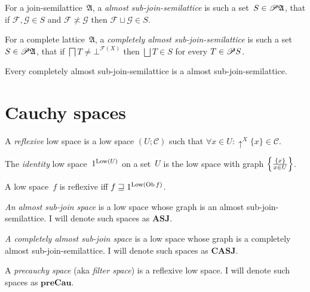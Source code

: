 \begin{defn}
For a join-semilattice~$\mathfrak{A}$, a \emph{almost sub-join-semilattice} is such a set~$S\in\mathscr{P}\mathfrak{A}$, that
if $\mathcal{F},\mathcal{G}\in S$ and $\mathcal{F} \nasymp \mathcal{G}$ then $\mathcal{F} \sqcup \mathcal{G}\in S$.
\end{defn}

\begin{defn}
For a complete lattice~$\mathfrak{A}$, a \emph{completely almost sub-join-semilattice} is such a set~$S\in\mathscr{P}\mathfrak{A}$, that
if $\bigsqcap T \neq \bot^{\mathscr{F}(X)}$ then $\bigsqcup T\in S$ for every $T\in\mathscr{P} S$.
\end{defn}

\begin{obvious}
Every completely almost sub-join-semilattice is a almost sub-join-semilattice.
\end{obvious}

\section{Cauchy spaces}

\begin{defn}
A \emph{reflexive} low space is a low space $( U ; \mathscr{C})$ such that
$\forall x \in U : \uparrow^X \{ x \} \in \mathscr{C}$.
\end{defn}

\begin{defn}
The \emph{identity} low space~$1^{\operatorname{Low}(U)}$ on a set~$U$ is the low space with graph $\left\{ \frac{\{x\}}{x\in U}\right\}$.
\end{defn}

\begin{obvious}\label{cs-refl-by-id}
A low space~$f$ is reflexive iff $f\sqsupseteq 1^{\operatorname{Low}(\operatorname{Ob} f)}$.
\end{obvious}

\begin{defn}
\emph{An almost sub-join space} is a low space whose graph is an almost sub-join-semilattice.
I will denote such spaces as $\mathbf{ASJ}$.
\end{defn}

\begin{defn}
\emph{A completely almost sub-join space} is a low space whose graph is a completely almost sub-join-semilattice.
I will denote such spaces as $\mathbf{CASJ}$.
\end{defn}

\begin{defn}
A \emph{precauchy space} (aka \emph{filter space}) is a reflexive low space.
I will denote such spaces as $\mathbf{preCau}$.
\end{defn}

